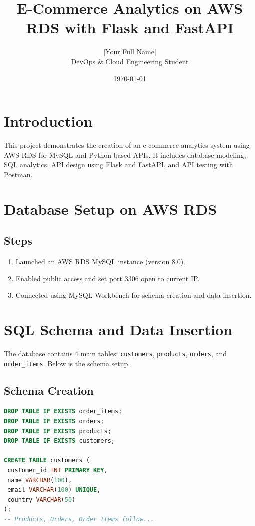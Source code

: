 \documentclass[12pt]{article}
\title{E-Commerce Analytics on AWS RDS with Flask and FastAPI}
\author{[Your Full Name] \\ DevOps & Cloud Engineering Student}
\date{\today}
\begin{document}
\maketitle
\tableofcontents
\newpage

\section{Introduction}
This project demonstrates the creation of an e-commerce analytics system using AWS RDS for MySQL and Python-based APIs. It includes database modeling, SQL analytics, API design using Flask and FastAPI, and API testing with Postman.

\section{Database Setup on AWS RDS}
\subsection{Steps}
\begin{enumerate}
    \item Launched an AWS RDS MySQL instance (version 8.0).
    \item Enabled public access and set port 3306 open to current IP.
    \item Connected using MySQL Workbench for schema creation and data insertion.
\end{enumerate}

\section{SQL Schema and Data Insertion}
The database contains 4 main tables: \texttt{customers}, \texttt{products}, \texttt{orders}, and \texttt{order\_items}. Below is the schema setup.

\subsection{Schema Creation}
\begin{lstlisting}[language=SQL, caption=Database Schema Script]
DROP TABLE IF EXISTS order_items;
DROP TABLE IF EXISTS orders;
DROP TABLE IF EXISTS products;
DROP TABLE IF EXISTS customers;

CREATE TABLE customers (
 customer_id INT PRIMARY KEY,
 name VARCHAR(100),
 email VARCHAR(100) UNIQUE,
 country VARCHAR(50)
);
-- Products, Orders, Order Items follow...
\end{lstlisting}
\end{document}
